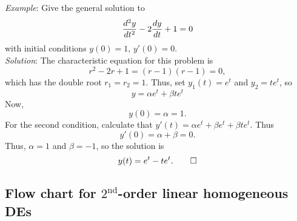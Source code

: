 \documentclass[10pt,driverfallback=hypertex]{report}
\newcounter{small}
\begin{document}
\noindent\emph{Example}: Give the general solution to
\begin{dmath*}
  \ddtwo{y}{t} - 2 \dd{y}{t}+1 =0
\end{dmath*}
with initial conditions $y(0) =1, \, y'(0) =0.$\\
\noindent\emph{Solution}:
The characteristic equation for this problem is
\begin{dmath*}
  r^2 - 2r +1 = (r-1)(r-1) =0,
\end{dmath*}
which has the double root $r_1=r_2=1$. Thus, set
$y_1(t) = e^t$ and $y_2=t e^t$, so
\begin{dmath*}
  y = \alpha e^t + \beta t e^t
\end{dmath*}
Now,
\begin{dmath*}[compact]
  y(0) = \alpha = 1.
\end{dmath*}
For the second condition, calculate that
$y'(t) = \alpha e^t + \beta e^t + \beta te^t$. Thus
\begin{dmath*}[compact]
  y'(0) = \alpha + \beta =0.
\end{dmath*}
Thus, $\alpha=1$ and $\beta =-1$, so the solution is
\begin{dmath*}[compact]
  y(t) = e^t - te^t. \qed
\end{dmath*}

\newpage
\subsection{Flow chart for $2^{\text{nd}}$-order linear homogeneous DEs}

\end{document}
